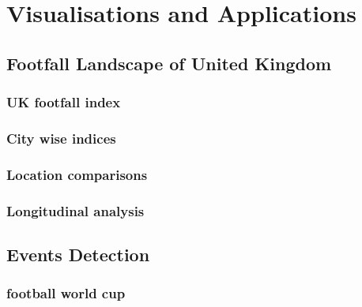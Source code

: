 \chapter{Visualisations and Applications} \label{chapter:application}


\section{Footfall Landscape of United Kingdom}
\subsection{UK footfall index}

\subsection{City wise indices}

\subsection{Location comparisons}

\subsection{Longitudinal analysis}

\section{Events Detection}



\subsection{football world cup}

